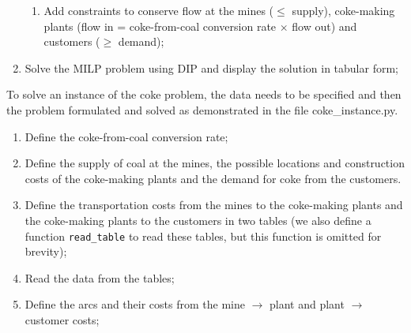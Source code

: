 \begin{enumerate}[leftmargin=0cm,itemindent=0.75cm,labelwidth=.5cm,labelsep=.25cm,labelindent=0cm,align=left]
\begin{enumerate}[leftmargin=0cm,itemindent=0.75cm,labelwidth=.5cm,labelsep=.25cm,labelindent=0cm,align=left]
\item Add constraints to conserve flow at the mines ($\leq$ supply), coke-making plants (flow in = coke-from-coal conversion rate $\times$ flow out) and customers ($\geq$ demand);

\end{enumerate}

\item Solve the \ac{MILP} problem using \ac{DIP} and display the solution in tabular form;

\end{enumerate}

To solve an instance of the coke problem, the data needs to be specified and then the problem formulated and solved as demonstrated in the file coke\_instance.py.
\begin{enumerate}[leftmargin=0cm,itemindent=0.75cm,labelwidth=.5cm,labelsep=.25cm,labelindent=0cm,align=left]
\item Define the coke-from-coal conversion rate;


\item Define the supply of coal at the mines, the possible locations and construction costs of the coke-making plants and the demand for coke from the customers.

\newpage


\item Define the transportation costs from the mines to the coke-making plants and the coke-making plants to the customers in two tables (we also define a function {\tt read\_table} to read these tables, but this function is omitted for brevity);


\item Read the data from the tables;


\item Define the arcs and their costs from the mine $\rightarrow$ plant and plant $\rightarrow$ customer costs;

\end{enumerate}

